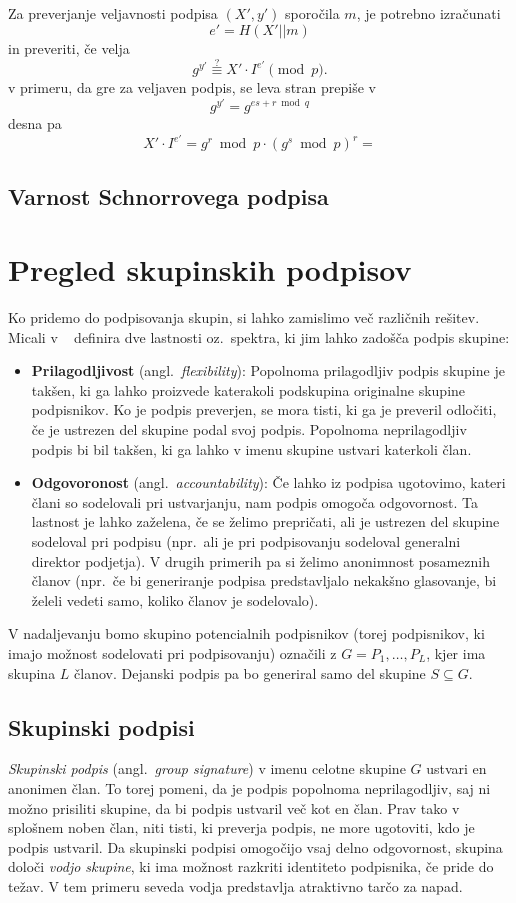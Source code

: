 \documentclass[isrm2, tisk]{fmfdelo}
\begin{document}
Za preverjanje veljavnosti podpisa $(X', y')$ sporočila $m$, je potrebno izračunati 
$$ 
e' = H(X' || m)
$$
in preveriti, če velja 
$$ 
g^{y'} \stackrel{?}{\equiv} X' \cdot I^{e'} \pmod p.
$$ 
v primeru, da gre za veljaven podpis, se leva stran prepiše v 
$$ 
g^{y'} = g^{es + r \bmod q}
$$
desna pa 
$$ 
X' \cdot I^{e'} = g^r \bmod p \cdot (g^s \bmod p)^r = 
$$

\subsection{Varnost Schnorrovega podpisa}

\section{Pregled skupinskih podpisov}
Ko pridemo do podpisovanja skupin, si lahko zamislimo več različnih rešitev. Micali v ~\cite{micali2001asm} 
definira dve lastnosti oz.\ spektra, ki jim lahko zadošča podpis skupine:
\begin{itemize}
    \item \textbf{Prilagodljivost} (angl.\ \textit{flexibility}): Popolnoma prilagodljiv podpis skupine
        je takšen, ki ga lahko proizvede katerakoli podskupina originalne skupine podpisnikov. Ko je podpis 
        preverjen, se mora tisti, ki ga je preveril odločiti, če je ustrezen del skupine podal svoj podpis. 
        Popolnoma neprilagodljiv podpis bi bil takšen, ki ga lahko v imenu skupine ustvari katerkoli član.
    \item \textbf{Odgovoronost} (angl.\ \textit{accountability}): Če lahko iz podpisa ugotovimo, kateri člani 
        so sodelovali pri ustvarjanju, nam podpis omogoča odgovornost. Ta lastnost je lahko zaželena, če 
        se želimo prepričati, ali je ustrezen del skupine sodeloval pri podpisu (npr.\ ali je pri podpisovanju 
        sodeloval generalni direktor podjetja). V drugih primerih pa si želimo anonimnost posameznih članov 
        (npr.\ če bi generiranje podpisa predstavljalo nekakšno glasovanje, bi želeli vedeti samo, koliko 
        članov je sodelovalo).
\end{itemize}

V nadaljevanju bomo skupino potencialnih podpisnikov (torej podpisnikov, ki imajo možnost sodelovati pri 
podpisovanju) označili z $G = P_1, \dots, P_L$, kjer ima skupina $L$ članov. Dejanski podpis pa bo 
generiral samo del skupine $S \subseteq G$.

\subsection{Skupinski podpisi}
\textit{Skupinski podpis} (angl.\ \textit{group signature}) v imenu celotne skupine $G$ ustvari en 
anonimen član. To torej pomeni, da je podpis popolnoma neprilagodljiv, saj ni možno prisiliti skupine,
da bi podpis ustvaril več kot en član. Prav tako v splošnem noben član, niti tisti, ki preverja podpis,
ne more ugotoviti, kdo je podpis ustvaril. Da skupinski podpisi omogočijo vsaj delno odgovornost, 
skupina določi \textit{vodjo skupine}, ki ima možnost razkriti identiteto podpisnika, če pride do 
težav. V tem primeru seveda vodja predstavlja atraktivno tarčo za napad.
\end{document}
